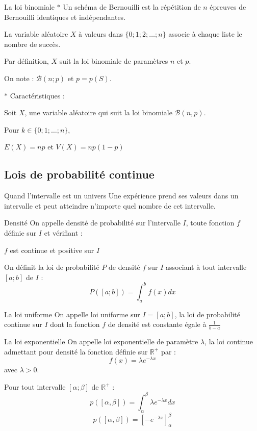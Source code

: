 \medskip

\begin{bclogo}{La loi binomiale}
$\ast$ Un schéma de Bernouilli est la répétition de $n$ épreuves de Bernouilli identiques et indépendantes.

La variable aléatoire $X$ à valeurs dans $\{0;1;2;\ldots;n\}$ associe à chaque liste le nombre de succès.

Par définition, $X$ suit la loi binomiale de paramètres $n$ et $p$.

On note : $\mathcal{B} (n;p)$ et $p=p(S)$.

$\ast$ Caractéristiques : 

Soit $X$, une variable aléatoire qui suit la loi binomiale $\mathcal{B}(n,p)$.

Pour $k\in \{0;1;\ldots;n\}$, 

$E(X)=np$ et $V(X)=np(1-p)$
\end{bclogo}



\subsection{Lois de probabilité continue}
\begin{bclogo}{Quand l'intervalle est un univers}
Une expérience prend ses valeurs dans un intervalle et peut atteindre n'importe quel nombre de cet intervalle.
\end{bclogo}

\medskip

\begin{bclogo}{Densité}
On appelle densité de probabilité sur l'intervalle $I$, toute fonction $f$ définie sur $I$ et vérifiant :

$f$ est continue et positive sur $I$

On définit la loi de probabilité $P$ de densité $f$ sur $I$ associant à tout intervalle $[a;b]$ de $I$ :
\[P([a;b])=\int _a ^b f(x)dx\]
\end{bclogo}

\medskip

\begin{bclogo}{La loi uniforme}
On appelle loi uniforme sur $I=[a;b]$, la loi de probabilité continue sur $I$ dont la fonction $f$ de densité est constante égale à $\frac{1}{b-a}$
\end{bclogo}

\medskip

\begin{bclogo}{La loi exponentielle}
On appelle loi exponentielle de paramètre $\lambda$, la loi continue admettant pour densité la fonction définie sur $ \mathbb{R}^+$ par : \[f(x)=\lambda e^{-\lambda x}\]
avec $\lambda >0$.

Pour tout intervalle $[\alpha ;\beta]$ de $\mathbb{R}^+$ : \[p([\alpha ,\beta])=\int _{\alpha} ^{\beta} \lambda e^{-\lambda x}dx\]
\[p([\alpha ,\beta ])=\left[ -e^{-\lambda x}\right] _{\alpha } ^{\beta }\]
\end{bclogo}


